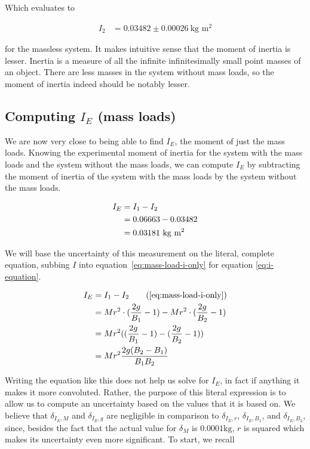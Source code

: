 \documentclass[coverpage]{article}
\newcommand{\iUnit}{\text{kg $\text{m}^2$}}
\begin{document}
	Which evaluates to
	
	\begin{align}
		I_2 &= 0.03482 \pm 0.00026\ \iUnit
	\end{align}

	for the massless system. It makes intuitive sense that the moment of inertia is lesser. Inertia is a measure of all the infinite infinitesimally small point masses of an object. There are less masses in the system without mass loads, so the moment of inertia indeed should be notably lesser.
	
	\subsection{Computing $I_E$ (mass loads)}
	
	We are now very close to being able to find $I_E$, the moment of just the mass loads. Knowing the experimental moment of inertia for the system with the mass loads and the system without the mass loads, we can compute $I_E$ by subtracting the moment of inertia of the system with the mass loads by the system without the mass loads.
	
	\begin{align}
		I_E &= I_1 - I_2 \label{eq:mass-load-i-only} \\
		&= 0.06663 - 0.03482 \notag \\
		&= 0.03181\ \iUnit
	\end{align}
	
	We will base the uncertainty of this measurement on the literal, complete equation, subbing $I$ into equation~\ref{eq:mass-load-i-only} for equation \ref{eq:i-equation}.
	
	\begin{align}
		I_E &= I_1 - I_2 \tag{\ref{eq:mass-load-i-only}} \\
		&= M r^2 \cdot (\frac{2g}{B_1} - 1) - Mr^2 \cdot (\frac{2g}{B_2} - 1) \notag \\
		&= M r^2 ((\frac{2g}{B_1} - 1) - (\frac{2g}{B_2} - 1)) \notag \\
		&= M r^2 \frac{2g(B_2 - B_1)}{B_1 B_2}
	\end{align}

	Writing the equation like this does not help us solve for $I_E$, in fact if anything it makes it more convoluted. Rather, the purpose of this literal expression is to allow us to compute an uncertainty based on the values that it is based on. We believe that $\delta_{I_E, M}$ and $\delta_{I_E, g}$ are negligible in comparison to $\delta_{I_E, r}$, $\delta_{I_E, B_1}$, and $\delta_{I_E, B_2}$, since, besides the fact that the actual value for $\delta_M$ is $0.0001 \text{kg}$, $r$ is squared which makes its uncertainty even more significant. To start, we recall
	
\end{document}
